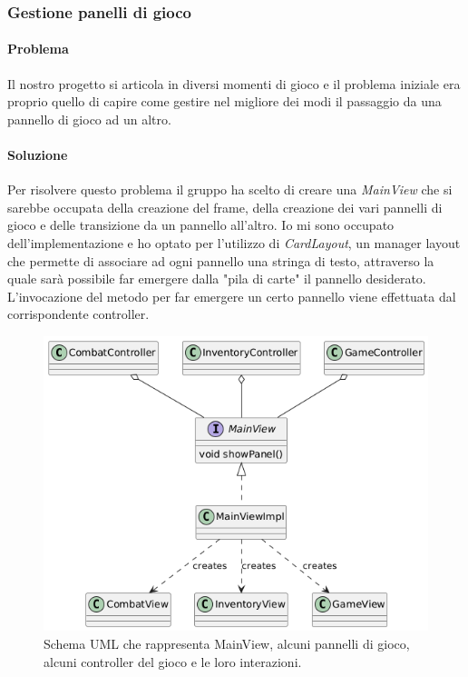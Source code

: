 \documentclass[a4paper,12pt]{report}
\begin{document}
\subsubsection{Gestione panelli di gioco}

\paragraph{Problema} Il nostro progetto si articola in diversi momenti di gioco e il problema iniziale
era proprio quello di capire come gestire nel migliore dei modi il passaggio da una pannello di gioco ad 
un altro.
\paragraph{Soluzione} Per risolvere questo problema il gruppo ha scelto di creare una \textit{MainView} che
si sarebbe occupata della creazione del frame, della creazione dei vari pannelli di gioco e
delle transizione da un pannello all'altro.
Io mi sono occupato dell'implementazione e ho optato per l'utilizzo di \textit{CardLayout}, un manager layout
che permette di associare ad ogni pannello una stringa di testo, attraverso la quale sarà possibile far emergere
dalla "pila di carte" il pannello desiderato. L'invocazione del metodo per far emergere un certo pannello viene effettuata
dal corrispondente controller.
\begin{figure}[H]
	\centering{}
	\includegraphics[width=\textwidth]{img/mainView.png}
	\caption{Schema UML che rappresenta MainView, alcuni pannelli di gioco, alcuni controller del gioco e le loro interazioni.}
	\label{img:mainView}
\end{figure}
\end{document}
